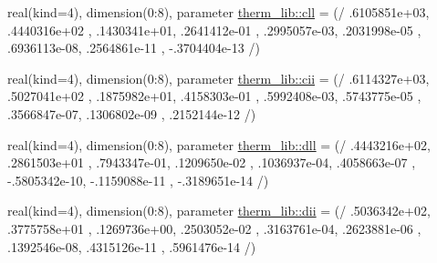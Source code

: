\begin{DoxyCompactItemize}
\item 
real(kind=4), dimension(0\+:8), parameter \hyperlink{namespacetherm__lib_a0fd2184c73856d805e115f4a13068150}{therm\+\_\+lib\+::cll} = (/ .\+6105851e+03, .\+4440316e+02 , .\+1430341e+01, .\+2641412e-\/01 , .\+2995057e-\/03, .\+2031998e-\/05 , .\+6936113e-\/08, .\+2564861e-\/11 , -\/.\+3704404e-\/13 /)
\item 
real(kind=4), dimension(0\+:8), parameter \hyperlink{namespacetherm__lib_a80e96618552a9428c5819e0f9fcbc242}{therm\+\_\+lib\+::cii} = (/ .\+6114327e+03, .\+5027041e+02 , .\+1875982e+01, .\+4158303e-\/01 , .\+5992408e-\/03, .\+5743775e-\/05 , .\+3566847e-\/07, .\+1306802e-\/09 , .\+2152144e-\/12 /)
\item 
real(kind=4), dimension(0\+:8), parameter \hyperlink{namespacetherm__lib_acfbfc8c511318be0ac3c435bec00f876}{therm\+\_\+lib\+::dll} = (/ .\+4443216e+02, .\+2861503e+01 , .\+7943347e-\/01, .\+1209650e-\/02 , .\+1036937e-\/04, .\+4058663e-\/07 , -\/.\+5805342e-\/10, -\/.\+1159088e-\/11 , -\/.\+3189651e-\/14 /)
\item 
real(kind=4), dimension(0\+:8), parameter \hyperlink{namespacetherm__lib_ac6f7b02070a3ef627b731ecd1b7afb1a}{therm\+\_\+lib\+::dii} = (/ .\+5036342e+02, .\+3775758e+01 , .\+1269736e+00, .\+2503052e-\/02 , .\+3163761e-\/04, .\+2623881e-\/06 , .\+1392546e-\/08, .\+4315126e-\/11 , .\+5961476e-\/14 /)
\end{DoxyCompactItemize}
